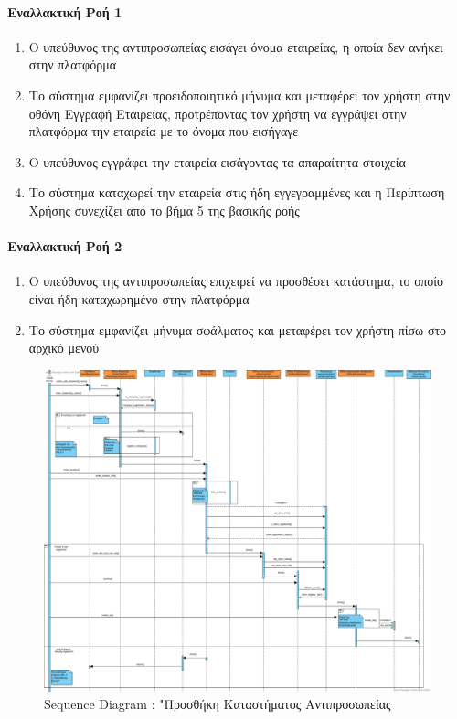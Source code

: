 \documentclass{../ol-softwaremanual}
\begin{document}
	\paragraph{Εναλλακτική Ροή 1}
	
	\begin{enumerate}
		\item Ο υπεύθυνος της αντιπροσωπείας εισάγει όνομα εταιρείας, η οποία δεν ανήκει στην πλατφόρμα
		\item Το σύστημα εμφανίζει προειδοποιητικό μήνυμα και μεταφέρει τον χρήστη στην οθόνη Εγγραφή Εταιρείας, προτρέποντας τον χρήστη να εγγράψει στην πλατφόρμα την εταιρεία με το όνομα που εισήγαγε		
		\item Ο υπεύθυνος εγγράφει την εταιρεία εισάγοντας τα απαραίτητα στοιχεία
		\item Το σύστημα καταχωρεί την εταιρεία στις ήδη εγγεγραμμένες και η Περίπτωση Χρήσης συνεχίζει από το βήμα 5 της βασικής ροής
	\end{enumerate}
	
	\paragraph{Εναλλακτική Ροή 2}
	
	\begin{enumerate}
		\item Ο υπεύθυνος της αντιπροσωπείας επιχειρεί να προσθέσει κατάστημα, το οποίο είναι ήδη καταχωρημένο στην πλατφόρμα
		\item Το σύστημα εμφανίζει μήνυμα σφάλματος και μεταφέρει τον χρήστη πίσω στο αρχικό μενού
	\end{enumerate}
	
	\begin{figure}[htbp!]
		\centering
		\includegraphics[scale=0.245]{img/seq_add_dealership_store.png}
		\caption{\en Sequence Diagram : "\gr Προσθήκη Καταστήματος Αντιπροσωπείας}
	\end{figure}
	
\end{document}
